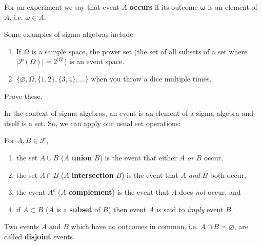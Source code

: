 For an experiment we say that event \(A\) \textbf{occurs} if its outcome \(\boldsymbol\omega\)
is an element of \(A\), i.e. \(\omega\in A\). 

\begin{example}
    Some examples of sigma algebras include:
    \begin{enumerate}
        \item If \(\Omega\) is a sample space, the power set (the set of all 
        subsets of a set where \(|\mathcal{P}(\Omega)|=2^{|\Omega|}\))
        is an event space.
        \item \(\{\varnothing, \Omega, \{1, 2\}, \{3, 4\}, \ldots \}\) when you throw a dice multiple times. 
    \end{enumerate}
\end{example}

\begin{exercise}
    Prove these.
\end{exercise}

In the context of sigma algebras, an event is an element of 
a sigma algebra and itself is a set. So, we can apply our usual set operations:

\bigskip
For \(A,B\in\mathcal{F}\),

\begin{enumerate}
    \item the set \(A\cup B\) (\(A\) \textbf{union} \(B\)) is the event that either \(A\) \textit{or} \(B\) occur,
    \item the set \(A\cap B\) (\(A\) \textbf{intersection} \(B\)) is the event that \(A\) \textit{and} \(B\) both occur,
    \item the event \(A^c\) (\(A\) \textbf{complement}) is the event that \(A\) does \textit{not} occur, and
    \item if \(A\subset B\) (\(A\) is a \textbf{subset} of \(B\)) then event \(A\) is said to \textit{imply} event \(B\).
\end{enumerate}

Two events \(A\) and \(B\) which have no outcomes in common, i.e. \(A\cap B=\varnothing\), 
are called \textbf{disjoint} events. 

\medskip





